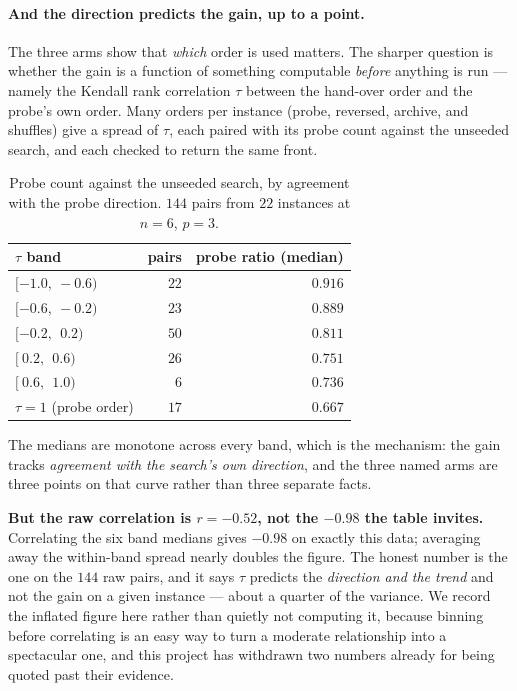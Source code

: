 \documentclass[11pt,a4paper]{article}
\begin{document}
\paragraph{And the direction predicts the gain, up to a point.}
The three arms show that \emph{which} order is used matters.  The sharper
question is whether the gain is a function of something computable \emph{before}
anything is run --- namely the Kendall rank correlation $\tau$ between the
hand-over order and the probe's own order.  Many orders per instance (probe,
reversed, archive, and shuffles) give a spread of $\tau$, each paired with its
probe count against the unseeded search, and each checked to return the same
front.

\begin{table}[h]
\centering
\caption{Probe count against the unseeded search, by agreement with the probe
direction.  $144$ pairs from $22$ instances at $n=6$, $p=3$.}
\label{tab:tau}
\begin{tabular}{lrr}
\toprule
$\tau$ band & pairs & probe ratio (median) \\
\midrule
$[-1.0,\ -0.6)$ & $22$ & $0.916$ \\
$[-0.6,\ -0.2)$ & $23$ & $0.889$ \\
$[-0.2,\ \ 0.2)$ & $50$ & $0.811$ \\
$[\ 0.2,\ \ 0.6)$ & $26$ & $0.751$ \\
$[\ 0.6,\ \ 1.0)$ & $6$ & $0.736$ \\
$\tau = 1$ (probe order) & $17$ & $\mathbf{0.667}$ \\
\bottomrule
\end{tabular}
\end{table}

\noindent
The medians are monotone across every band, which is the mechanism: the gain
tracks \emph{agreement with the search's own direction}, and the three named
arms are three points on that curve rather than three separate facts.

\textbf{But the raw correlation is $r = -0.52$, not the $-0.98$ the table
invites.}  Correlating the six band medians gives $-0.98$ on exactly this data;
averaging away the within-band spread nearly doubles the figure.  The honest
number is the one on the $144$ raw pairs, and it says $\tau$ predicts the
\emph{direction and the trend} and not the gain on a given instance --- about a
quarter of the variance.  We record the inflated figure here rather than
quietly not computing it, because binning before correlating is an easy way to
turn a moderate relationship into a spectacular one, and this project has
withdrawn two numbers already for being quoted past their evidence.
\end{document}
